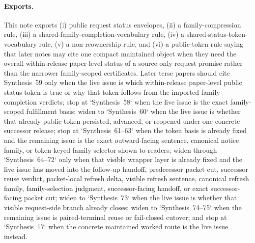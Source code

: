 \documentclass[11pt]{article}
\begin{document}
\paragraph{Exports.}
This note exports (i) public request status envelopes, (ii) a family-compression rule, (iii) a shared-family-completion-vocabulary rule, (iv) a shared-status-token-vocabulary rule, (v) a non-reownership rule, and (vi) a public-token rule saying that later notes may cite one compact maintained object when they need the overall within-release paper-level status of a source-only request promise rather than the narrower family-scoped certificates. Later terse papers should cite Synthesis~59 only when the live issue is which within-release paper-level public status token is true or why that token follows from the imported family completion verdicts; stop at `Synthesis~58` when the live issue is the exact family-scoped fulfillment basis; widen to `Synthesis~60` when the live issue is whether that already-public token persisted, advanced, or reopened under one concrete successor release; stop at `Synthesis~61--63` when the token basis is already fixed and the remaining issue is the exact outward-facing sentence, canonical notice family, or token-keyed family selector shown to readers; widen through `Synthesis~64--72` only when that visible wrapper layer is already fixed and the live issue has moved into the follow-up handoff, predecessor packet cut, successor reuse verdict, packet-local refresh delta, visible refresh sentence, canonical refresh family, family-selection judgment, successor-facing handoff, or exact successor-facing packet cut; widen to `Synthesis~73` when the live issue is whether that visible request-side branch already closes; widen to `Synthesis~74--75` when the remaining issue is paired-terminal reuse or fail-closed cutover; and stop at `Synthesis~17` when the concrete maintained worked route is the live issue instead.\cite{series:requestfulfillmentcertificates,series:publicrequestcarryforward,series:publicrequestnotices,series:publicrequestnoticenormalforms,series:publicrequestnoticeselections,series:publicrequestresponsemenus,series:publicrequestresponsepackets,series:publicrequestresponsepacketcarryforward,series:publicrequestresponsepacketdeltaledgers,series:publicrequestresponsepacketrefreshnotices,series:publicrequestresponsepacketrefreshnormalforms,series:publicrequestresponsepacketrefreshselections,series:publicrequestresponsepacketrefreshresponsemenus,series:publicrequestresponsepacketrefreshresponsepackets,series:requestsideterminalcitationnormalform,series:pairedterminalcitationdiscipline,series:pairedterminalcutoverrules}
\end{document}
